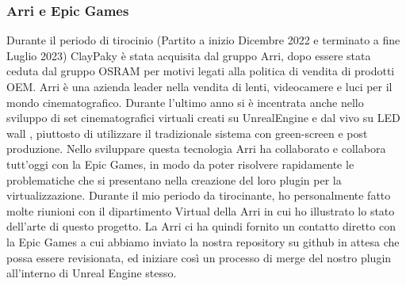 \documentclass[main.tex]{subfiles}
\begin{document}
\subsubsection{Arri e Epic Games}\label{subsec:6_1_Arri-EG}
Durante il periodo di tirocinio (Partito a inizio Dicembre 2022 e terminato a fine Luglio 2023) ClayPaky è stata acquisita dal gruppo Arri, dopo essere stata ceduta dal gruppo OSRAM per motivi legati alla politica di vendita di prodotti OEM. Arri è una azienda leader nella vendita di lenti, videocamere e luci per il mondo cinematografico. Durante l'ultimo anno si è incentrata anche nello sviluppo di set cinematografici virtuali creati su UnrealEngine e  dal vivo su LED wall \cite{virtualProduction}, piuttosto di utilizzare il tradizionale sistema con green-screen e post produzione. Nello sviluppare questa tecnologia Arri ha collaborato e collabora tutt'oggi con la Epic Games, in modo da poter risolvere rapidamente le problematiche che si presentano nella creazione del loro plugin per la virtualizzazione. Durante il mio periodo da tirocinante, ho personalmente fatto molte riunioni con il dipartimento Virtual della Arri in cui ho illustrato lo stato dell'arte di questo progetto. La Arri ci ha quindi fornito un contatto diretto con la Epic Games a cui abbiamo inviato la nostra repository su github \cite{gdtfImporterPlugin} in attesa che possa essere revisionata, ed iniziare così un processo di merge del nostro plugin all'interno di Unreal Engine stesso.

\clearpage
\end{document}
